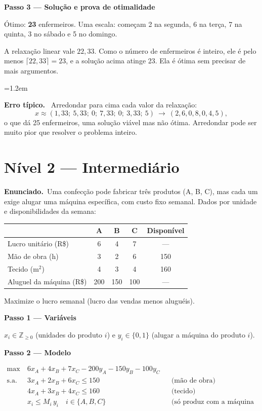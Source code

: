 \documentclass[11pt,a4paper]{article}
\newcommand{\enunciado}{\par\textbf{Enunciado.}\ }
\newcommand{\passo}[1]{\par\medskip\textbf{#1}\par}
\newenvironment{nota}[1]{\par\smallskip\begin{list}{}{\leftmargin=1.2em\rightmargin=0pt}\item[]\textbf{#1.}\ }{\end{list}}
\begin{document}
\passo{Passo 3 --- Solução e prova de otimalidade}
Ótimo: \textbf{23} enfermeiros. Uma escala: começam 2 na segunda, 6 na terça, 7 na quinta, 3 no sábado e 5 no domingo.

A relaxação linear vale $22{,}33$. Como o número de enfermeiros é inteiro, ele é pelo menos $\lceil22{,}33\rceil=23$, e a
solução acima atinge 23. Ela é ótima sem precisar de mais argumentos.

\begin{nota}{Erro típico}
Arredondar para cima cada valor da relaxação:
\[
  x\approx(1{,}33;\ 5{,}33;\ 0;\ 7{,}33;\ 0;\ 3{,}33;\ 5) \ \longrightarrow\ (2, 6, 0, 8, 0, 4, 5),
\]
o que dá 25 enfermeiros, uma solução viável mas não ótima. Arredondar pode ser muito pior que
resolver o problema inteiro.
\end{nota}

\clearpage
\section*{Nível 2 --- Intermediário}

\enunciado Uma confecção pode fabricar três produtos (A, B, C), mas cada um exige alugar uma máquina específica, com
custo fixo semanal. Dados por unidade e disponibilidades da semana:
\begin{center}
\begin{tabular}{lcccc}
\toprule
 & A & B & C & Disponível\\
\midrule
Lucro unitário (R\$) & 6 & 4 & 7 & ---\\
Mão de obra (h) & 3 & 2 & 6 & 150\\
Tecido (m$^2$) & 4 & 3 & 4 & 160\\
Aluguel da máquina (R\$) & 200 & 150 & 100 & ---\\
\bottomrule
\end{tabular}
\end{center}
Maximize o lucro semanal (lucro das vendas menos aluguéis).

\passo{Passo 1 --- Variáveis}
$x_i\in\mathbb{Z}_{\ge0}$ (unidades do produto $i$) e $y_i\in\{0,1\}$ (alugar a máquina do produto $i$).

\passo{Passo 2 --- Modelo}
\begin{align*}
  \max\ & 6x_A + 4x_B + 7x_C - 200y_A - 150y_B - 100y_C\\
  \text{s.a.}\ & 3x_A + 2x_B + 6x_C \le 150 && \text{(mão de obra)}\\
  & 4x_A + 3x_B + 4x_C \le 160 && \text{(tecido)}\\
  & x_i \le M_i\,y_i \quad i\in\{A,B,C\} && \text{(só produz com a máquina alugada)}
\end{align*}
\end{document}
